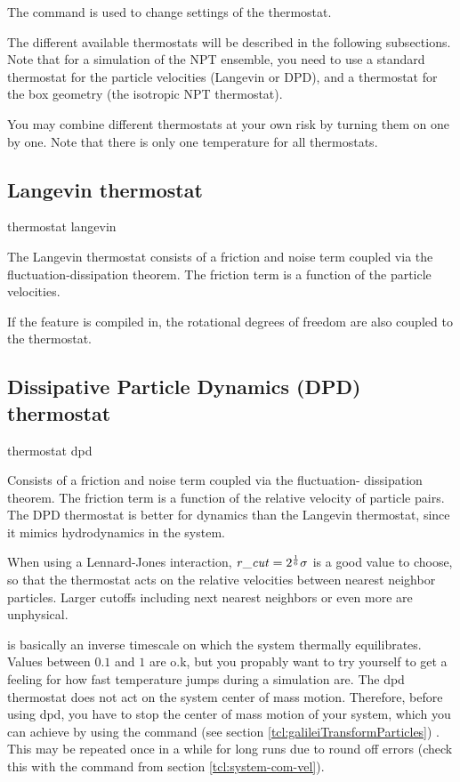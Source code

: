 The  command is used to change settings of the
thermostat.  

The different available thermostats will be described in the following
subsections. Note that for a simulation of the NPT ensemble, you need
to use a standard thermostat for the particle velocities (\eg Langevin
or DPD), and a thermostat for the box geometry (\eg the isotropic NPT
thermostat).

You may combine different thermostats at your own risk by turning them
on one by one. Note that there is only one temperature for all
thermostats.

\subsection{Langevin thermostat}
\begin{essyntax}
  thermostat langevin  
\end{essyntax}

The Langevin thermostat consists of a friction and noise term coupled
via the fluctuation-dissipation theorem. The friction term is a
function of the particle velocities.  

If the feature  is compiled in, the rotational
degrees of freedom are also coupled to the thermostat.

\subsection{Dissipative Particle Dynamics (DPD) thermostat}
\begin{essyntax}
  thermostat dpd   
\end{essyntax}

Consists of a friction and noise term coupled via the fluctuation-
dissipation theorem. The friction term is a function of the relative
velocity of particle pairs.  The DPD thermostat is better for dynamics
than the Langevin thermostat, since it mimics hydrodynamics in the
system.  

When using a Lennard-Jones interaction, $\mathrm{\mathit{r\_cut}} = 2^{\frac{1}{6}}
\sigma$ is a good value to choose, so that the thermostat acts on the
relative velocities between nearest neighbor particles.  Larger
cutoffs including next nearest neighbors or even more are unphysical.

 is basically an inverse timescale on which the system
thermally equilibrates.  Values between $0.1$ and $1$ are o.k, but you
propably want to try yourself to get a feeling for how fast
temperature jumps during a simulation are. The dpd thermostat does not
act on the system center of mass motion.  Therefore, before using dpd,
you have to stop the center of mass motion of your system, which you
can achieve by using the command 
(see section \vref{tcl:galileiTransformParticles}) . This may be
repeated once in a while for long runs due to round off errors (check
this with the command  from section
\vref{tcl:system-com-vel}).

